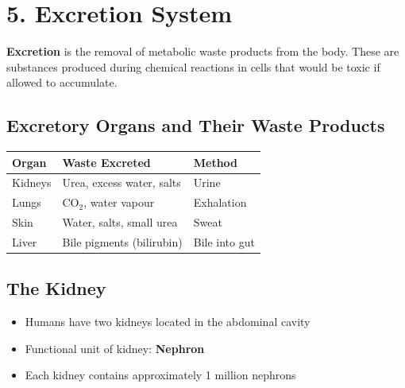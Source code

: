 \documentclass[12pt]{article}
\newcommand{\hcell}[1]{\textbf{\color{white}#1}}
\begin{document}
\section{5. Excretion System}

\begin{defbox}[Excretion]
\textbf{Excretion} is the removal of metabolic waste products from the body. These are substances produced during chemical reactions in cells that would be toxic if allowed to accumulate.
\end{defbox}

\subsection{Excretory Organs and Their Waste Products}
\begin{center}
\renewcommand{\arraystretch}{1.4}
\begin{tabular}{|C{4cm}|C{4.5cm}|C{4cm}|}
\hline
{}\hcell{Organ} & \hcell{Waste Excreted} & \hcell{Method} \\
\hline
Kidneys & Urea, excess water, salts & Urine \\
 Lungs & CO$_2$, water vapour & Exhalation \\
Skin & Water, salts, small urea & Sweat \\
 Liver & Bile pigments (bilirubin) & Bile into gut \\
\hline
\end{tabular}
\end{center}

\subsection{The Kidney}
\begin{itemize}[leftmargin=16pt, itemsep=3pt]
  \item Humans have two kidneys located in the abdominal cavity
  \item Functional unit of kidney: \textbf{Nephron}
  \item Each kidney contains approximately 1 million nephrons
\end{itemize}
\end{document}
